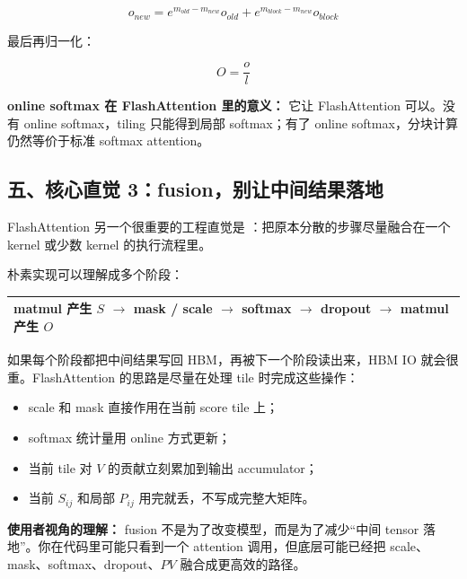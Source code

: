 \[
o_{new}
=
e^{m_{old}-m_{new}}o_{old}
+
e^{m_{block}-m_{new}}o_{block}
\]

最后再归一化：

\[
O=\frac{o}{l}
\]

\begin{summarybox}
\textbf{online softmax 在 FlashAttention 里的意义：} 它让 FlashAttention 可以。没有 online softmax，tiling 只能得到局部 softmax；有了 online softmax，分块计算仍然等价于标准 softmax attention。
\end{summarybox}

\subsection{五、核心直觉 3：fusion，别让中间结果落地}

FlashAttention 另一个很重要的工程直觉是 ：把原本分散的步骤尽量融合在一个 kernel 或少数 kernel 的执行流程里。

朴素实现可以理解成多个阶段：

\begin{center}
\begin{tabular}{p{13.2cm}}
\hline
matmul 产生 $S$ $\rightarrow$ mask / scale $\rightarrow$ softmax $\rightarrow$ dropout $\rightarrow$ matmul 产生 $O$ \\
\hline
\end{tabular}
\end{center}

如果每个阶段都把中间结果写回 HBM，再被下一个阶段读出来，HBM IO 就会很重。FlashAttention 的思路是尽量在处理 tile 时完成这些操作：

\begin{itemize}[leftmargin=1.5em]
  \item scale 和 mask 直接作用在当前 score tile 上；
  \item softmax 统计量用 online 方式更新；
  \item 当前 tile 对 $V$ 的贡献立刻累加到输出 accumulator；
  \item 当前 $S_{ij}$ 和局部 $P_{ij}$ 用完就丢，不写成完整大矩阵。
\end{itemize}

\begin{intubox}
\textbf{使用者视角的理解：} fusion 不是为了改变模型，而是为了减少“中间 tensor 落地”。你在代码里可能只看到一个 attention 调用，但底层可能已经把 scale、mask、softmax、dropout、$PV$ 融合成更高效的路径。
\end{intubox}

